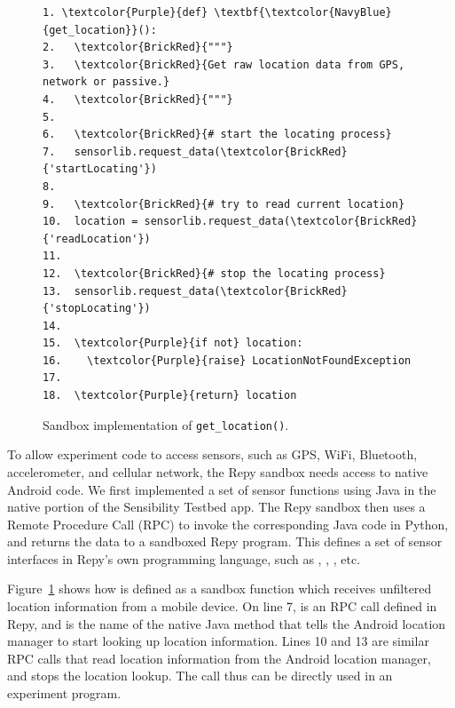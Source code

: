 
\begin{figure}
\begin{Verbatim}
1. \textcolor{Purple}{def} \textbf{\textcolor{NavyBlue}{get_location}}():
2.   \textcolor{BrickRed}{"""}
3.   \textcolor{BrickRed}{Get raw location data from GPS, network or passive.}
4.   \textcolor{BrickRed}{"""}
5. 
6.   \textcolor{BrickRed}{# start the locating process} 
7.   sensorlib.request_data(\textcolor{BrickRed}{'startLocating'})
8.
9.   \textcolor{BrickRed}{# try to read current location}
10.  location = sensorlib.request_data(\textcolor{BrickRed}{'readLocation'})
11.
12.  \textcolor{BrickRed}{# stop the locating process} 
13.  sensorlib.request_data(\textcolor{BrickRed}{'stopLocating'})
14.
15.  \textcolor{Purple}{if not} location:
16.    \textcolor{Purple}{raise} LocationNotFoundException    
17.  
18.  \textcolor{Purple}{return} location
\end{Verbatim}
\caption{\small Sandbox implementation of \texttt{get\_location()}. 
\label{fig-getlocation}}
\end{figure}

To allow experiment code to access sensors, such as 
GPS, WiFi, Bluetooth, accelerometer, and cellular network, the Repy sandbox
needs access to native Android code. We first implemented a set of sensor functions using
Java in the native portion of the Sensibility Testbed app. The Repy 
sandbox then uses a Remote Procedure Call (RPC) to invoke the
corresponding Java code in Python, and returns the data 
to a sandboxed Repy program. This defines a set of sensor interfaces in 
Repy's own programming language, such as , 
, , etc. 

Figure~\ref{fig-getlocation} shows how  
is defined as a sandbox function which receives unfiltered location 
information from a mobile device. 
On line 7,  is an RPC call 
defined in Repy, 
and  is the name of the native Java method that tells the Android 
location manager to start looking up location information. Lines 10 and 13 are similar RPC 
calls that read location information from the Android location manager, and stops the location 
lookup. The call  thus %
can be directly used in an experiment program. 

